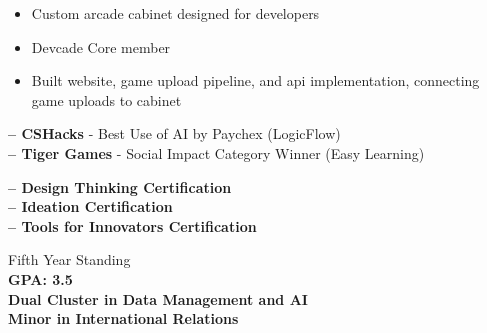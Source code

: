 \documentclass[10pt,a4paper,ragged2e,withhyper]{altacv}
\begin{document}
\begin{paracol}{2}
\divider

\begin{itemize}
    \item Custom arcade cabinet designed for developers
    \item Devcade Core member
    \item Built website, game upload pipeline, and api implementation, connecting game uploads to cabinet
\end{itemize}\par



\textbf{ -- CSHacks} - Best Use of AI by Paychex (LogicFlow)\\
\textbf{ -- Tiger Games} - Social Impact Category Winner (Easy Learning)\\

\divider

\textbf{ -- Design Thinking Certification}\\
\textbf{ -- Ideation Certification}\\
\textbf{ -- Tools for Innovators Certification}

\medskip

\switchcolumn


Fifth Year Standing\\
\textbf{GPA: 3.5}\\
\textbf{Dual Cluster in Data Management and AI}\\
\textbf{Minor in International Relations}\\

\medskip


\par\smallskip
{}
\medskip
\divider

\par\smallskip
{}
\par\smallskip
{}
\par
{}
\par



\end{paracol}
\end{document}
